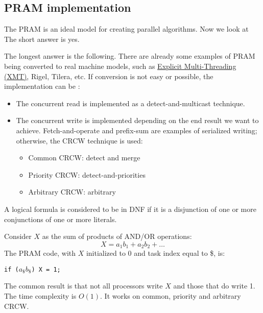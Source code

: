 \subsection{PRAM implementation}

The PRAM is an ideal model for creating parallel algorithms. Now we look at  The short answer is yes.

\highspace
The longest answer is the following. There are already some examples of PRAM being converted to real machine models, such as \href{https://en.wikipedia.org/wiki/Explicit_multi-threading}{Explicit Multi-Threading \break (XMT)}, Rigel, Tilera, etc. If conversion is not easy or possible, the implementation can be :
\begin{itemize}
    \item The concurrent read is implemented as a detect-and-multicast technique.
    \item The concurrent write is implemented depending on the end result we want to achieve. Fetch-and-operate and prefix-sum are examples of serialized writing; otherwise, the CRCW technique is used:
    \begin{itemize}
        \item Common CRCW: detect and merge
        \item Priority CRCW: detect-and-priorities
        \item Arbitrary CRCW: arbitrary
    \end{itemize}
\end{itemize}

\begin{examplebox}
    A logical formula is considered to be in DNF if it is a disjunction of one or more conjunctions of one or more literals.

    Consider $X$ as the sum of products of AND/OR operations:
    \begin{equation*}
        X = a_{1}b_{1} + a_{2}b_{2} + \dots
    \end{equation*}
    The PRAM code, with $X$ initialized to $0$ and task index equal to \$, is:
    \begin{center}
        \texttt{if ($a_{\$}b_{\$}$) X = 1;}
    \end{center}
    The common result is that not all processors write $X$ and those that do write 1. The time complexity is $O\left(1\right)$. It works on common, priority and arbitrary CRCW.
\end{examplebox}

